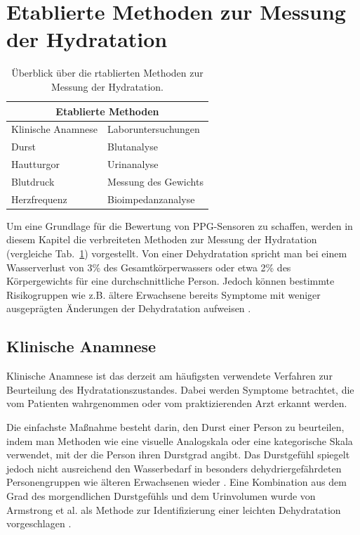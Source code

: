 \documentclass[10pt,a4paper,headinclude,twoside, plainheadsepline, open=right, numbers=noenddot, twocolumn]{article}
\begin{document}
\section{Etablierte Methoden zur Messung der Hydratation}
\label{methoden zur messung der hydratation}

\begin{table}[ht]
\centering
\begin{tabular*}{10cm}{p{4.5cm}p{4.5cm}}
\toprule
\multicolumn{2}{c}{\textbf{Etablierte Methoden}} \\
 \midrule
Klinische Anamnese & Laboruntersuchungen  \\
\cmidrule(r){1-1}\cmidrule(l){2-2}
Durst & Blutanalyse \\
Hautturgor & Urinanalyse  \\
Blutdruck & Messung des Gewichts  \\
Herzfrequenz & Bioimpedanzanalyse  \\
\bottomrule
\end{tabular*}
\caption{Überblick über die rtablierten Methoden zur Messung der Hydratation.}
\label{methodenübersicht}
\end{table}


Um eine Grundlage für die Bewertung von PPG-Sensoren zu schaffen, werden in diesem Kapitel die verbreiteten Methoden zur Messung der Hydratation (vergleiche Tab.~\ref{methodenübersicht}) vorgestellt.
Von einer Dehydratation spricht man bei einem Wasserverlust von 3\% des Gesamtkörperwassers oder etwa 2\% des Körpergewichts für eine durchschnittliche Person.
Jedoch können bestimmte Risikogruppen wie z.B. ältere Erwachsene bereits Symptome mit weniger ausgeprägten Änderungen der Dehydratation aufweisen \cite{garret2018engineering}.

\subsection{Klinische Anamnese}
\label{klinische anamnese}

Klinische Anamnese ist das derzeit am häufigsten verwendete Verfahren zur Beurteilung des Hydratationszustandes.
Dabei werden Symptome betrachtet, die vom Patienten wahrgenommen oder vom praktizierenden Arzt erkannt werden.
 
Die einfachste Maßnahme besteht darin, den Durst einer Person zu beurteilen, indem man Methoden wie eine visuelle Analogskala oder eine kategorische Skala verwendet, mit der die Person ihren Durstgrad angibt.
Das Durstgefühl spiegelt jedoch nicht ausreichend den Wasserbedarf in besonders dehydriergefährdeten Personengruppen wie älteren Erwachsenen wieder \cite{garret2018engineering}.
Eine Kombination aus dem Grad des morgendlichen Durstgefühls und dem Urinvolumen wurde von Armstrong et al. als Methode zur Identifizierung einer leichten Dehydratation vorgeschlagen \cite{armstrong2013novel}.
\end{document}
